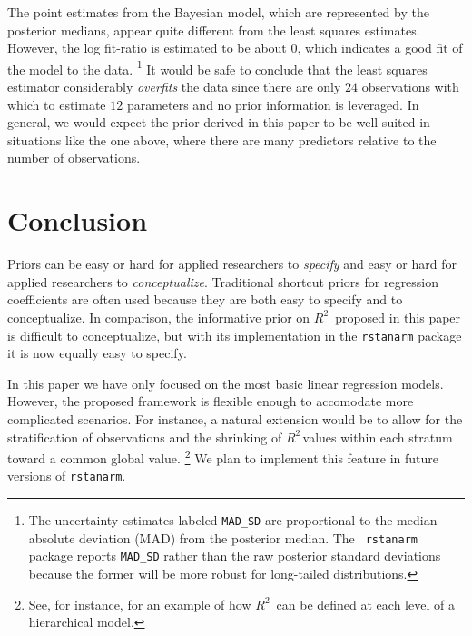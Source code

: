 \documentclass[11pt]{article}
\newcommand{\Rsq}{$R^2\,$}
\begin{document}
The point estimates from the Bayesian model, which are represented by the
posterior medians, appear quite different from the least squares estimates.
However, the log fit-ratio is estimated to be about $0$, which indicates a good
fit of the model to the data.%
\footnote{The uncertainty estimates labeled {\tt MAD\_SD} are proportional to
the median absolute deviation (MAD) from the posterior median. The {\tt
rstanarm} package reports {\tt MAD\_SD} rather than the raw posterior standard
deviations because the former will be more robust for long-tailed distributions.
}
It would be safe to conclude that the least
squares estimator considerably \emph{overfits} the data since there are only
$24$ observations with which to estimate $12$ parameters and no prior
information is leveraged. In general, we would expect the prior derived in this
paper to be well-suited in situations like the one above, where there are many
predictors relative to the number of observations.


\section{Conclusion}

Priors can be easy or hard for applied researchers to \emph{specify} and easy or
hard for applied researchers to \emph{conceptualize}. Traditional shortcut
priors for regression coefficients are often used because they are both easy to
specify and to conceptualize. In comparison, the informative prior on \Rsq
proposed in this paper is difficult to conceptualize, but with its
implementation in the {\tt rstanarm} package it is now equally easy to specify.

In this paper we have only focused on the most basic linear regression models.
However, the proposed framework is flexible enough to accomodate more
complicated scenarios. For instance, a natural extension would be to allow for
the stratification of observations and the shrinking of \Rsq values within each
stratum toward a common global value.%
\footnote{See, for instance,  for an example of how \Rsq
can be defined at each level of a hierarchical model.}
We plan to implement this feature in future versions of {\tt rstanarm}.


\nocite{Rcore}
\nocite{HSAUR3-package}



\end{document}
